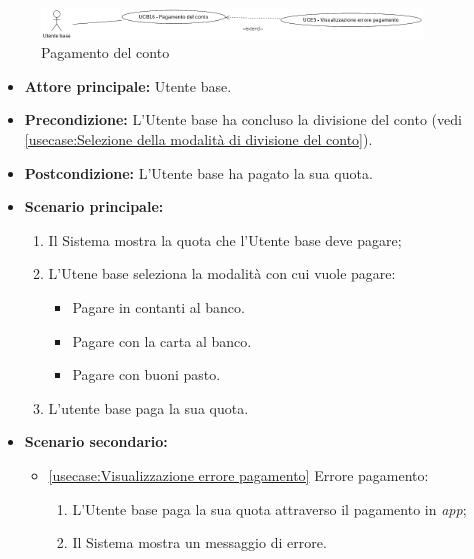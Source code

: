 \label{usecase:Pagamento del conto}

\begin{figure}[h]
	\centering
	\includegraphics[width=0.9\textwidth]{./uml/UCB16.png} 
	\caption{Pagamento del conto}
	\label{fig:UCB15}
  \end{figure}

\begin{itemize}
	\item \textbf{Attore principale:} Utente base.

	\item \textbf{Precondizione:} L'Utente base ha concluso la divisione del conto (vedi \autoref{usecase:Selezione della modalità di divisione del conto}).

	\item \textbf{Postcondizione:} L'Utente base ha pagato la sua quota.

	\item \textbf{Scenario principale:}
            \begin{enumerate}
                \item Il Sistema mostra la quota che l'Utente base deve pagare;
                \item L'Utene base seleziona la modalità con cui vuole pagare:
                \begin{itemize}
                    \item Pagare in contanti al banco.
                    \item Pagare con la carta al banco.
                    \item Pagare con buoni pasto.
                \end{itemize}
				\item L'utente base paga la sua quota.
	      \end{enumerate}

    \item \textbf{Scenario secondario:}
		  \begin{itemize}
			  \item \autoref{usecase:Visualizzazione errore pagamento} Errore pagamento:
				\begin{enumerate}
					\item L'Utente base paga la sua quota attraverso il pagamento in \textit{app};
					\item  Il Sistema mostra un messaggio di errore.
				\end{enumerate}
		  \end{itemize}
\end{itemize}